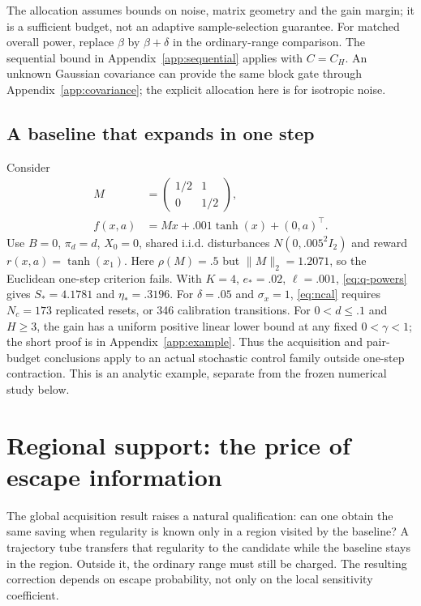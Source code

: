 \documentclass[twocolumn,nameyear]{autart}
\begin{document}
The allocation assumes bounds on noise, matrix geometry and the gain
margin; it is a sufficient budget, not an adaptive sample-selection
guarantee. For matched overall
power, replace $\beta$ by $\beta+\delta$ in the ordinary-range comparison.
The sequential bound in Appendix~\ref{app:sequential} applies with
$C=C_H$. An unknown Gaussian covariance can provide the same block
gate through Appendix~\ref{app:covariance}; the explicit allocation here
is for isotropic noise.

\subsection{A baseline that expands in one step}\label{sec:nonnormal}
Consider
\begin{align}\label{eq:nonnormal-example}
 M&=\begin{pmatrix}1/2&1\\0&1/2\end{pmatrix},\nonumber\\
 f(x,a)&=Mx+.001\tanh(x)+(0,a)^\top.
\end{align}
Use $B=0$, $\pi_d=d$, $X_0=0$, shared i.i.d. disturbances
$N(0,.005^2I_2)$ and reward $r(x,a)=\tanh(x_1)$.
Here $\rho(M)=.5$ but $\|M\|_2=1.2071$, so the Euclidean
one-step criterion fails. With $K=4$, $e_*=.02$, $\ell=.001$,
\eqref{eq:q-powers} gives $S_*=4.1781$ and $\eta_*=.3196$.
For $\delta=.05$ and $\sigma_x=1$, \eqref{eq:ncal} requires
$N_c=173$ replicated resets, or 346 calibration transitions.
For $0<d\le.1$ and $H\ge3$, the gain has a uniform positive
linear lower bound at any fixed $0<\gamma<1$; the short proof is in
Appendix~\ref{app:example}. Thus the acquisition and pair-budget
conclusions apply to an actual stochastic control family outside
one-step contraction. This is an analytic example, separate from the
frozen numerical study below.

\section{Regional support: the price of escape information}\label{sec:regional}
The global acquisition result raises a natural qualification: can one
obtain the same saving when regularity is known only in a region visited
by the baseline? A trajectory tube transfers that regularity to the
candidate while the baseline stays in the region. Outside it, the
ordinary range must still be charged. The resulting correction depends
on escape probability, not only on the local sensitivity coefficient.
\end{document}
